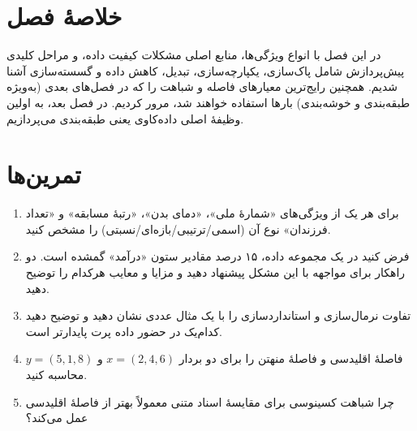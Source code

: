 \section*{خلاصهٔ فصل}

در این فصل با انواع ویژگی‌ها، منابع اصلی مشکلات کیفیت داده، و مراحل کلیدی
پیش‌پردازش شامل پاک‌سازی، یکپارچه‌سازی، تبدیل، کاهش داده و گسسته‌سازی آشنا
شدیم. همچنین رایج‌ترین معیارهای فاصله و شباهت را که در فصل‌های بعدی
(به‌ویژه طبقه‌بندی و خوشه‌بندی) بارها استفاده خواهند شد، مرور کردیم. در
فصل بعد، به اولین وظیفهٔ اصلی داده‌کاوی یعنی طبقه‌بندی می‌پردازیم.

\section*{تمرین‌ها}

\begin{enumerate}
    \item برای هر یک از ویژگی‌های «شمارهٔ ملی»، «دمای بدن»، «رتبهٔ مسابقه»
          و «تعداد فرزندان» نوع آن (اسمی/ترتیبی/بازه‌ای/نسبتی) را مشخص کنید.
    \item فرض کنید در یک مجموعه داده، ۱۵ درصد مقادیر ستون «درآمد» گمشده است.
          دو راهکار برای مواجهه با این مشکل پیشنهاد دهید و مزایا و معایب
          هرکدام را توضیح دهید.
    \item تفاوت نرمال‌سازی  و استانداردسازی  را با
          یک مثال عددی نشان دهید و توضیح دهید کدام‌یک در حضور داده پرت
          پایدارتر است.
    \item فاصلهٔ اقلیدسی و فاصلهٔ منهتن را برای دو بردار
          $x = (2, 4, 6)$ و $y = (5, 1, 8)$ محاسبه کنید.
    \item چرا شباهت کسینوسی برای مقایسهٔ اسناد متنی معمولاً بهتر از فاصلهٔ
          اقلیدسی عمل می‌کند؟
\end{enumerate}
